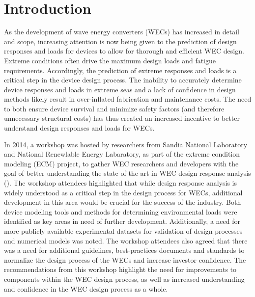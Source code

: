 \section{Introduction}

As the development of wave energy converters (WECs) has increased in detail and scope, increasing attention is now being given to the prediction of design responses and loads for devices to allow for thorough and efficient WEC design. 
Extreme conditions often drive the maximum design loads and fatigue requirements. Accordingly, the prediction of extreme responses and loads is a critical step in the device design process. 
The inability to accurately determine device responses and loads in extreme seas and a lack of confidence in design methods likely result in over-inflated fabrication and maintenance costs.
The need to both ensure device survival and minimize safety factors (and therefore unnecessary structural costs) has thus created an increased incentive to better understand design responses and loads for WECs.

In 2014, a workshop was hosted by researchers from Sandia National Laboratory and National Renewlable Energy Labaratory, as part of the extreme condition modeling (ECM) project, to gather WEC researchers and developers with the goal of better understanding the state of the art in WEC design response analysis (\cite{Coe2014}). 
The workshop attendees highlighted that while design response analysis is widely understood as a critical step in the design process for WECs, additional development in this area would be crucial for the success of the industry. 
Both device modeling tools and methods for determining environmental loads were identified as key areas in need of further development. 
Additionally, a need for more publicly available experimental datasets for validation of design processes and numerical models was noted. 
The workshop attendees also agreed that there was a need for additional guidelines, best-practices documents and standards to normalize the design process of the WECs and increase investor confidence. 
The recommendations from this workshop highlight the need for improvements to components within the WEC design process, as well as increased understanding and confidence in the WEC design process as a whole.


